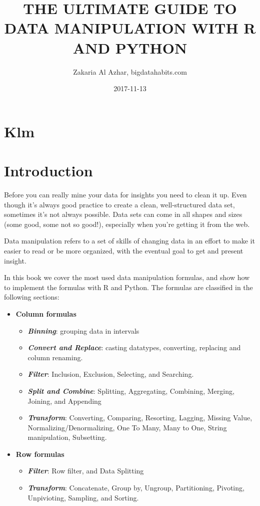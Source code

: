 \documentclass[12pt,]{book}
\title{THE ULTIMATE GUIDE TO DATA MANIPULATION WITH R AND PYTHON}
\author{Zakaria Al Azhar, bigdatahabits.com}
\date{2017-11-13}
\providecommand{\tightlist}{%
  \setlength{\itemsep}{0pt}\setlength{\parskip}{0pt}}
\begin{document}
\maketitle

{
\setcounter{tocdepth}{1}
\tableofcontents
}
\chapter{Klm}\label{klm}

\chapter{Introduction}\label{intro}

Before you can really mine your data for insights you need to clean it
up. Even though it's always good practice to create a clean,
well-structured data set, sometimes it's not always possible. Data sets
can come in all shapes and sizes (some good, some not so good!),
especially when you're getting it from the web.

Data manipulation refers to a set of skills of changing data in an
effort to make it easier to read or be more organized, with the eventual
goal to get and present insight.

In this book we cover the most used data manipulation formulas, and show
how to implement the formulas with R and Python. The formulas are
classified in the following sections:

\begin{itemize}
\tightlist
\item
  \textbf{Column formulas}

  \begin{itemize}
  \tightlist
  \item
    \textbf{\emph{Binning}}: grouping data in intervals
  \item
    \textbf{\emph{Convert and Replace}}: casting datatypes, converting,
    replacing and column renaming.
  \item
    \textbf{\emph{Filter}}: Inclusion, Exclusion, Selecting, and
    Searching.
  \item
    \textbf{\emph{Split and Combine}}: Splitting, Aggregating,
    Combining, Merging, Joining, and Appending
  \item
    \textbf{\emph{Transform}}: Converting, Comparing, Resorting,
    Lagging, Missing Value, Normalizing/Denormalizing, One To Many, Many
    to One, String manipulation, Subsetting.
  \end{itemize}
\item
  \textbf{Row formulas}

  \begin{itemize}
  \tightlist
  \item
    \textbf{\emph{Filter}}: Row filter, and Data Splitting
  \item
    \textbf{\emph{Transform}}: Concatenate, Group by, Ungroup,
    Partitioning, Pivoting, Unpivioting, Sampling, and Sorting.
  \end{itemize}
\end{itemize}
\end{document}
